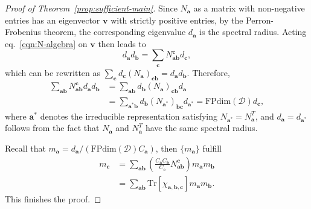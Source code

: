 \documentclass[prx, twocolumn, superscriptaddress, dvipsnames]{revtex4-2}
\theoremstyle{definition}
\newcommand{\R}{\textcolor{red}}
\newcommand{\mS}{\mathcal{S}}
\newcommand{\mT}{\mathcal{T}}
\newcommand{\tr}{\mathrm{Tr}}
\newcommand{\vbnt}{\mathbf{a}}
\def\XQ#1{{\color{XQ}#1}}
\begin{document}
\begin{proof}[Proof of Theorem~\ref{prop:sufficient-main}]
    Since $N_\vbnt$ as a matrix with non-negative entries has an eigenvector $\textbf{v}$ with strictly positive entries, by the Perron-Frobenius theorem, the corresponding eigenvalue $d_\vbnt$ is the spectral radius. Acting eq.~\eqref{eqn:N-algebra} on $\textbf{v}$ then leads to
    \begin{equation}
        d_\vbnt d_\mathbf{b} = \sum_\mathbf{c} N^\mathbf{c}_{\mathbf{ab}} d_\mathbf{c} ,
    \end{equation}
    which can be rewritten as $\sum_\mathbf{c} d_\mathbf{c} (N_\vbnt)_{\mathbf{cb}}=d_\vbnt d_\mathbf{b}$. 
    Therefore,
    \begin{equation}
    \begin{aligned}
        \sum_{\mathbf{ab}} N^\mathbf{c}_{\mathbf{ab}} d_\mathbf{a} d_\mathbf{b} &=  \sum_{\mathbf{ab}} d_\mathbf{b} (N_\mathbf{a})_{\mathbf{cb}} d_\mathbf{a}  \\
        & = \sum_{\mathbf{a}^* \mathbf{b}} d_\mathbf{b} (N_{\mathbf{a}^*})_{\mathbf{bc}} d_{\mathbf{a}^*} = \mathrm{FPdim}(\mathcal D) d_\mathbf{c}, 
    \end{aligned}
    \end{equation}
    where $\mathbf{a}^*$ denotes the irreducible representation satisfying $N_{\mathbf{a}^*}=N_\mathbf{a}^T$, and $d_\mathbf{a}=d_{\mathbf{a}^*}$ follows from the fact that $N_\mathbf{a}$ and $N_\mathbf{a}^T$ have the same spectral radius. 
    
    Recall that $m_\vbnt = d_\vbnt/(\mathrm{FPdim}(\mathcal D) C_\vbnt)$, then $\{m_\vbnt\}$ fulfill 
    \begin{equation}
    \begin{aligned}
        m_\mathbf{c} &= \sum_{\mathbf{ab}} \left(\frac{C_\mathbf{a} C_\mathbf{b}}{C_\mathbf{c}} N_{\mathbf{ab}}^\mathbf{c} \right)  m_\mathbf{a} m_\mathbf{b}\\
        &=\sum_{\mathbf{ab}} \tr[\chi_{\mathbf{a,b,c}}] m_\vbnt m_\mathbf{b}.
    \end{aligned}
    \end{equation}
    This finishes the proof. 
\end{proof}
\end{document}
